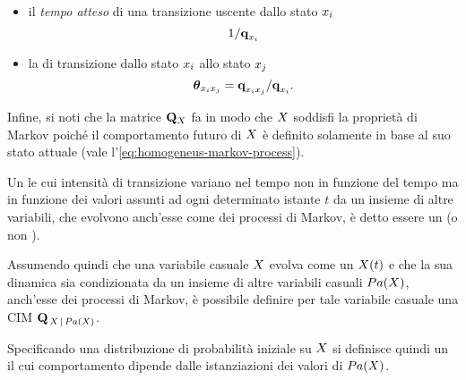 \begin{itemize}
    \item il \emph{tempo atteso} di una transizione uscente dallo stato $\mathnormal{x}_i$ \[1/\boldsymbol{\textbf{\text{q}}}_{\mathnormal{x}_i}\]
    \item la \emph{} di transizione dallo stato $\mathnormal{x}_i$ allo stato $\mathnormal{x}_j$ \[\boldsymbol{\textbf{\text{$\theta$}}}_{\mathnormal{x}_i\mathnormal{x}_j}=\boldsymbol{\textbf{\text{q}}}_{\mathnormal{x}_i\mathnormal{x}_j}/\boldsymbol{\textbf{\text{q}}}_{\mathnormal{x}_i}\text{.}\]
\end{itemize}
Infine, si noti che la matrice $\mathbf{Q}_{\mathnormal{X}}$ fa in modo che $\mathnormal{X}$ soddisfi la proprietà di Markov poiché il comportamento futuro di $\mathnormal{X}$ è definito solamente in base al suo stato attuale (vale l'\autoref{eq:homogeneus-markov-process}).

\begin{definizione}[\upcase\mprocess*{} \cond*{}]
\label{defn:conditional-markov-process}
Un \mprocess*{} le cui intensità di transizione variano nel tempo non in funzione del tempo ma in funzione dei valori assunti ad ogni determinato istante $t$ da un insieme di altre variabili, che evolvono anch'esse come dei processi di Markov, è detto essere un \mprocess*{} \cond*{} (o \mprocess*{} non \omog*{}).

Assumendo quindi che una variabile casuale $\mathnormal{X}$ evolva come un \mprocess*{} $\mathnormal{X}(t)$ e che la sua dinamica sia condizionata da un insieme di altre variabili casuali $Pa(\mathnormal{X})$, anch'esse dei processi di Markov, è possibile definire per tale variabile casuale una \acf{CIM} $\mathbf{Q}_{\,\mathnormal{X}\,\arrowvert\,Pa(\mathnormal{X})}$.

Specificando una distribuzione di probabilità iniziale su $\mathnormal{X}$ si definisce quindi un \mprocess*{} il cui comportamento dipende dalle istanziazioni dei valori di $Pa(\mathnormal{X})$.
\end{definizione}

